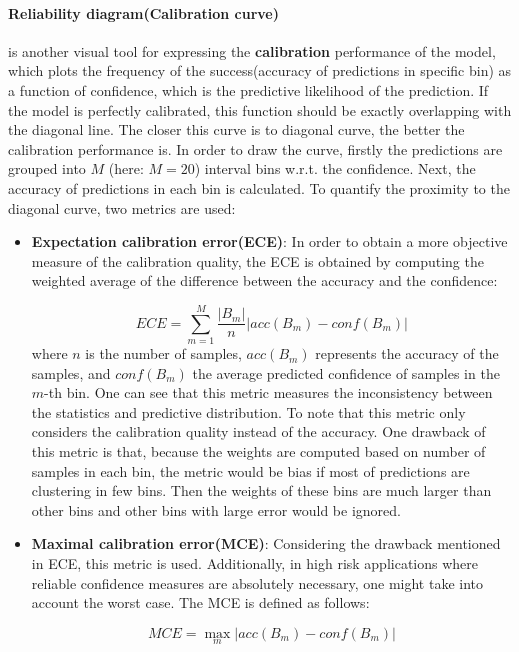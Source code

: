 \paragraph{Reliability diagram(Calibration curve)} is another visual tool for expressing the \textbf{calibration} performance of the model\cite{guo2017calibration}, which plots the frequency of the success(accuracy of predictions in specific bin) as a function of confidence, which is the predictive likelihood of the prediction.
If the model is perfectly calibrated, this function should be exactly overlapping with the diagonal line.
The closer this curve is to diagonal curve, the better the calibration performance is.
In order to draw the curve, firstly the predictions are grouped into $M$ (here: $M=20$) interval bins w.r.t. the confidence.
Next, the accuracy of predictions in each bin is calculated.
To quantify the proximity to the diagonal curve, two metrics are used:
\begin{itemize}
	\item \textbf{Expectation calibration error(ECE)}: In order to obtain a more objective measure of the calibration quality, the ECE is obtained by computing the weighted average of the difference between the accuracy and the confidence:
	
	\begin{equation}
	ECE = \sum_{m=1}^{M}\frac{|B_m|}{n}|acc(B_m) - conf(B_m)|
	\end{equation}
	where $n$ is the number of samples, $acc(B_m)$ represents the accuracy of the samples, and $conf(B_m)$ the average predicted confidence of samples in the $m$-th bin.
	One can see that this metric measures the inconsistency between the statistics and predictive distribution.
	To note that this metric only considers the calibration quality instead of the accuracy.
	One drawback of this metric is that, because the weights are computed based on number of samples in each bin, the metric would be bias if most of predictions are clustering in few bins.
	Then the weights of these bins are much larger than other bins and other bins with large error would be ignored. 
	
	\item \textbf{Maximal calibration error(MCE)}:
	Considering the drawback mentioned in ECE, this metric is used. Additionally, in high risk applications where reliable confidence measures are absolutely necessary, one might take into account the worst case. The MCE is defined as follows:
	
	\begin{equation}
	MCE = \max_m|acc(B_m) - conf(B_m)|
	\end{equation}
\end{itemize}


